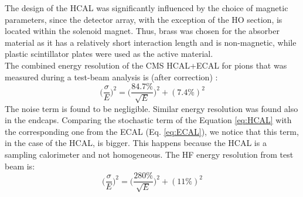 \indent The design of the HCAL was significantly influenced by the choice of magnetic parameters, since the detector array, with the exception of the HO section, is located within the solenoid magnet. Thus, brass was chosen for the absorber material as it has a relatively short interaction length and is non-magnetic, while plastic scintillator plates were used as the active material.\\
\indent The combined energy resolution of the CMS HCAL+ECAL for pions that was measured during a test-beam analysis is (after correction) \cite{Cavallari_2011}:
\begin{equation}\label{eq:HCAL}
    \bigg( \frac{\sigma}{E}\bigg)^2 = \bigg(\frac{84.7\%}{\sqrt{E}}\bigg)^2 + (7.4\%)^2
\end{equation}
The noise term is found to be negligible. Similar energy resolution was found also in the endcaps. Comparing the stochastic term of the Equation \ref{eq:HCAL} with the corresponding one from the ECAL (Eq. \ref{eq:ECAL}), we notice that this term, in the case of the HCAL, is bigger. This happens because the HCAL is a sampling calorimeter and not homogeneous. The HF energy resolution from test beam \cite{HCAL_2007} is:
\begin{equation}
     \bigg(\frac{\sigma}{E}  \bigg)^2 =  \bigg(\frac{280\%}{\sqrt{E}} \bigg)^2 + (11 \%)^2
\end{equation}
